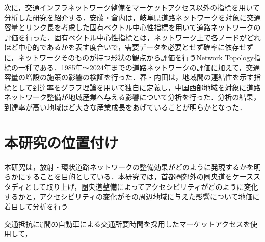 次に，交通インフラネットワーク整備をマーケットアクセス以外の指標を用いて分析した研究を紹介する．安藤・倉内\cite{kurauchi2020}は，岐阜県道路ネットワークを対象に交通容量とリンク長を考慮した固有ベクトル中心性指標を用いて道路ネットワークの評価を行った．固有ベクトル中心性指標とは，ネットワーク上で各ノードがどれほど中心的であるかを表す度合いで，需要データを必要とせず確率に依存せずに，ネットワークそのものが持つ形状の観点から評価を行うNetwork Topology指標の一種である．1985年〜2024年までの道路ネットワークの評価に加えて，交通容量の増設の施策の影響の検証を行った．春・内田\cite{haru2011}は，地域間の連結性を示す指標として到達率をグラフ理論を用いて独自に定義し，中国西部地域を対象に道路ネットワーク整備が地域産業へ与える影響について分析を行った．分析の結果，到達率が高い地域ほど大きな産業成長をあげていることが明らかとなった．

\section{本研究の位置付け}
本研究は，放射・環状道路ネットワークの整備効果がどのように発現するかを明らかにすることを目的としている．本研究では，首都圏郊外の圏央道をケーススタディとして取り上げ，圏央道整備によってアクセシビリティがどのように変化するかと，アクセシビリティの変化がその周辺地域に与えた影響について地価に着目して分析を行う.



交通抵抗にij間の自動車による交通所要時間を採用したマーケットアクセスを使用して，